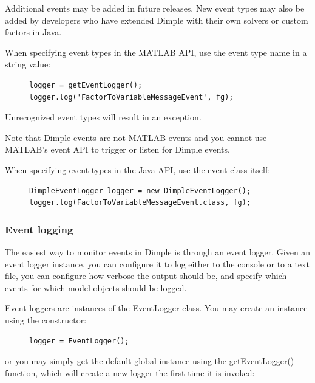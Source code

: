 Additional events may be added in future releases. New event types may also be added by developers who have extended Dimple with their own solvers or custom factors in Java.

\ifmatlab
When specifying event types in the MATLAB API, use the event type name in a string value:

\begin{figure}[H]
\begin{lstlisting}
logger = getEventLogger();
logger.log('FactorToVariableMessageEvent', fg);
\end{lstlisting}
\end{figure}

Unrecognized event types will result in an exception.

Note that Dimple events are not MATLAB events and you cannot use MATLAB's event API to trigger or listen for Dimple events.
\fi

\ifjava
When specifying event types in the Java API, use the event class itself:

\begin{figure}[H]
\begin{lstlisting}
DimpleEventLogger logger = new DimpleEventLogger();
logger.log(FactorToVariableMessageEvent.class, fg);
\end{lstlisting}
\end{figure}
\fi

\FloatBarrier

\subsubsection{Event logging}

The easiest way to monitor events in Dimple is through an event logger. Given an event logger instance, you can configure it to log either to the console or to a text file, you can configure how verbose the output should be, and specify which events for which model objects should be logged.

\ifmatlab
Event loggers are instances of the EventLogger class. You may create an
instance using the constructor:

\begin{figure}[H]
\begin{lstlisting}
logger = EventLogger();
\end{lstlisting}
\end{figure}

or you may simply get the default global instance using the getEventLogger() function, which will create a new logger the first time it is invoked:

